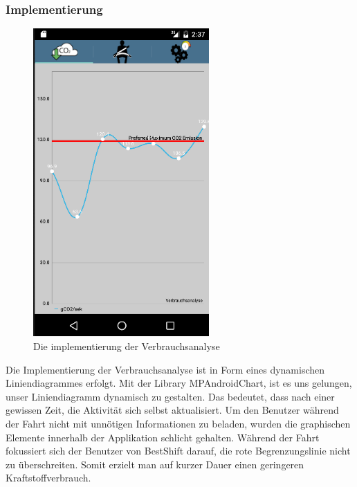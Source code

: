 \subsubsection{Implementierung}
\begin{figure}
    \centering
    \includegraphics[width=0.6\textwidth]{images/verbrauch}
    \caption{Die implementierung der Verbrauchsanalyse \cite{BOZH.ch3-verbrauchsanalyse.verbrauch}}
\end{figure}

Die Implementierung der Verbrauchsanalyse ist in Form eines dynamischen Liniendiagrammes erfolgt.
Mit der Library MPAndroidChart, ist es uns gelungen, unser Liniendiagramm dynamisch zu gestalten.
Das bedeutet, dass nach einer gewissen Zeit, die Aktivität sich selbst aktualisiert.
Um den Benutzer während der Fahrt nicht mit unnötigen Informationen zu beladen, wurden die graphischen
Elemente innerhalb der Applikation schlicht gehalten.
Während der Fahrt fokussiert sich der Benutzer von BestShift darauf, die rote Begrenzungslinie nicht zu überschreiten.
Somit erzielt man auf kurzer Dauer einen geringeren Kraftstoffverbrauch.



\clearpage %